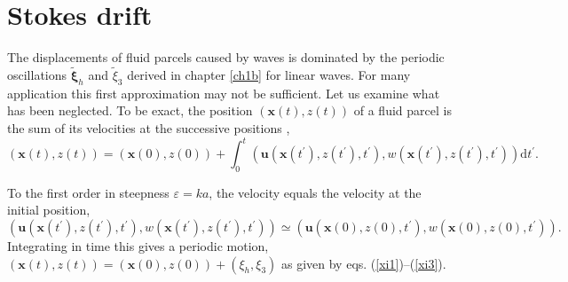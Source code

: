 
\section{Stokes drift}
The displacements of fluid parcels caused by waves is dominated by the periodic oscillations  $\widetilde{\mathbf \xi}_h$ and
$\widetilde{\xi}_3$ derived in chapter \ref{ch1b} for linear waves. For many application this first approximation may not be sufficient.
Let us examine what has been neglected. 
To be exact, the position $\left({\mathbf x}(t),z(t)\right)$
of a fluid parcel is the sum of its velocities at the successive positions \citep[e.g.][p. 43]{Phillips1977},
\begin{equation}
    \left({\mathbf x}(t),z(t)\right)= \left({\mathbf x}(0),z(0)\right)
    +\int_0^t \left(\mathbf{u}\left({\mathbf x}(t^\prime),z(t^\prime),t^\prime\right),w\left({\mathbf x}(t^\prime),z(t^\prime),t^\prime\right)\right) {\mathrm
    d}t^\prime.
\end{equation}

To the first order in steepness $\varepsilon=ka$, the velocity equals the velocity at the initial position, 
\begin{equation}
 \left(\mathbf{u}\left({\mathbf
x}(t^\prime),z(t^\prime),t^\prime\right),w\left({\mathbf
x}(t^\prime),z(t^\prime),t^\prime\right)\right)
\simeq \left(\mathbf{u}\left({\mathbf
x}(0),z(0),t^\prime\right),w\left({\mathbf
x}(0),z(0),t^\prime\right)\right).
\end{equation}
Integrating in time this gives a periodic motion, 
$\left({\mathbf x}(t),z(t)\right)=\left({\mathbf
x}(0),z(0)\right)+(\xi_h,\xi_3)$ as given by eqs.
(\ref{xi1})--(\ref{xi3}). 


